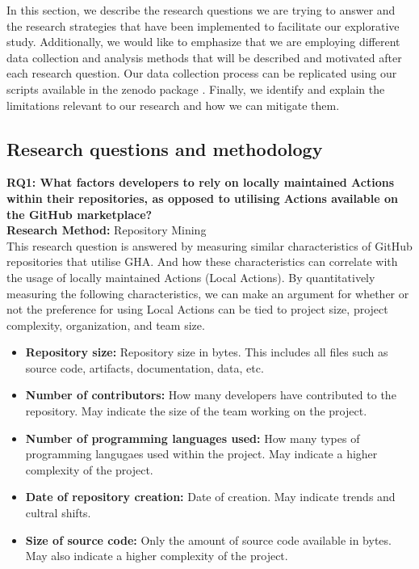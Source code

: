 \documentclass[conference]{IEEEtran}
\begin{document}
    In this section, we describe the research questions we are trying to answer and the research strategies that have been implemented to facilitate our explorative study. Additionally, we would like to emphasize that we are employing different data collection and analysis methods that will be described and motivated after each research question. Our data collection process can be replicated using our scripts available in the zenodo package\cite{Marof2024} . Finally, we identify and explain the limitations relevant to our research and how we can mitigate them. 

    \subsection{Research questions and methodology}
        \textbf{RQ1: What factors developers to rely on locally maintained Actions within their repositories, as opposed to utilising Actions available on the GitHub marketplace?}
        \\

        \textbf{Research Method:}  Repository Mining \\
          This research question is answered by measuring similar characteristics of GitHub repositories that utilise GHA. And how these characteristics can correlate with the usage of locally maintained Actions (Local Actions). By quantitatively measuring the following characteristics, we can make an argument for whether or not the preference for using Local Actions can be tied to project size, project complexity, organization, and team size. \\
          \begin{itemize}
            \item \textbf{Repository size:} Repository size in bytes. This includes all files such as source code, artifacts, documentation, data, etc.
            \item \textbf{Number of contributors:} How many developers have contributed to the repository. May indicate the size of the team working on the project.
            \item	\textbf{Number of programming languages used:} How many types of programming langugaes used within the project. May indicate a higher complexity of the project.
            \item \textbf{Date of repository creation:} Date of creation. May indicate trends and cultral shifts.\\
            \item \textbf{Size of source code:} Only the amount of source code available in bytes. May also indicate a higher complexity of the project. \\
          \end{itemize}
          
\end{document}
